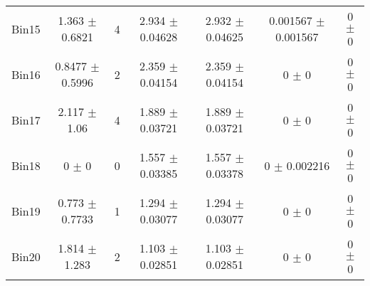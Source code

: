 \begin{tabular}{@{\extracolsep{4pt}}lcccccc@{}}
     Bin15 & 1.363 $\pm$ 0.6821 & 4 & 2.934 $\pm$ 0.04628 & 2.932 $\pm$ 0.04625 & 0.001567 $\pm$ 0.001567 & 0 $\pm$ 0 \\ 
     Bin16 & 0.8477 $\pm$ 0.5996 & 2 & 2.359 $\pm$ 0.04154 & 2.359 $\pm$ 0.04154 & 0 $\pm$ 0 & 0 $\pm$ 0 \\ 
     Bin17 & 2.117 $\pm$ 1.06 & 4 & 1.889 $\pm$ 0.03721 & 1.889 $\pm$ 0.03721 & 0 $\pm$ 0 & 0 $\pm$ 0 \\ 
     Bin18 & 0 $\pm$ 0 & 0 & 1.557 $\pm$ 0.03385 & 1.557 $\pm$ 0.03378 & 0 $\pm$ 0.002216 & 0 $\pm$ 0 \\ 
     Bin19 & 0.773 $\pm$ 0.7733 & 1 & 1.294 $\pm$ 0.03077 & 1.294 $\pm$ 0.03077 & 0 $\pm$ 0 & 0 $\pm$ 0 \\ 
     Bin20 & 1.814 $\pm$ 1.283 & 2 & 1.103 $\pm$ 0.02851 & 1.103 $\pm$ 0.02851 & 0 $\pm$ 0 & 0 $\pm$ 0 \\ 
\hline\hline
  \end{tabular}
